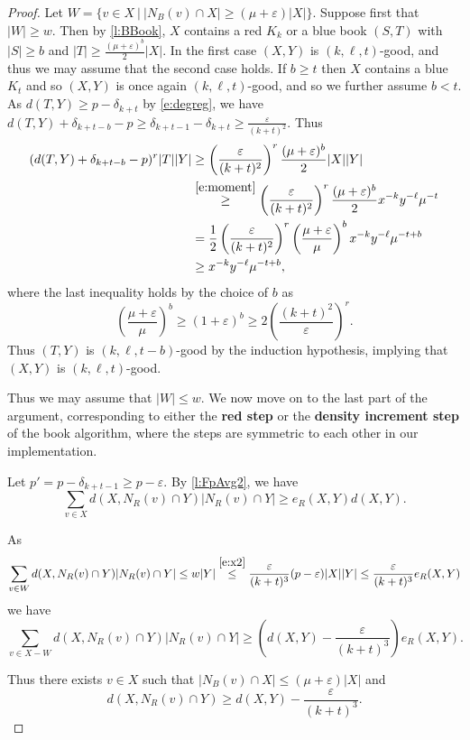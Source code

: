 \documentclass[reqno,final,12pt]{amsart}
\newcommand{\eps}{\varepsilon}
\newcommand{\fs}[2]{\left(\frac{#1}{#2}\right)}
\newcommand{\s}[1]{\left(#1\right)}
\begin{document}
\begin{proof}
Let  $W =\{ v \in X \: | \:  |N_B(v) \cap X| \geq (\mu + \eps)|X|\}$. Suppose first that $|W| \geq w$. Then by \cref{l:BBook}, $X$ contains a red $K_k$ or a blue book $(S,T)$ with $|S| \geq b$ and $|T| \geq  \frac{ (\mu + \eps)^b}{2}|X|$. In the first case $(X,Y)$ is $(k,\ell,t)$-good, and thus we may assume that the second case holds.  If $b \geq t$ then $X$ contains a blue $K_t$ and so  $(X,Y)$ is once again $(k,\ell,t)$-good, and so we further assume $b < t$.
As $d(T,Y) \geq p-\delta_{k+t}$ by \eqref{e:degreg}, we have $d(T,Y) + \delta_{k+t-b} -p \geq \delta_{k+t-1}-\delta_{k+t} \geq \frac{\eps}{(k+t)^2}.$
Thus \begin{align*} 
(d(T,Y) + \delta_{k+t-b} - p)^r |T||Y| &\geq \fs{\eps }{(k+t)^2}^r \frac{(\mu + \eps)^b}{2}|X||Y| \\ &\stackrel{\eqref{e:moment}}{\geq}  \fs{\eps }{(k+t)^2}^r\frac{(\mu + \eps)^b}{2}x^{-k}y^{-\ell}\mu^{-t } \\& = \frac{1}{2}\fs{\eps}{(k+t)^2}^r\fs{\mu + \eps}{\mu}^b x^{-k}y^{-\ell}\mu^{-t+b} \\&\geq x^{-k}y^{-\ell}\mu^{-t+b},
\end{align*}
where the last inequality holds by the choice of $b$ as
$$ \fs{\mu + \eps}{\mu}^b \geq (1+\eps)^b \geq 2\fs{(k+t)^{2}}{\eps}^r.$$ 
Thus $(T,Y)$ is $(k,\ell,t-b)$-good by the induction hypothesis, implying that   $(X,Y)$ is $(k,\ell,t)$-good. 

Thus we may assume that $|W| \leq w$. We now move on to the last part of the argument, corresponding to either the \textbf{red step} or the \textbf{density increment step} of the book algorithm, where the steps are symmetric to each other in our implementation. 

Let $p'= p-\delta_{k+t-1} \geq p-\eps.$ By \cref{l:FpAvg2}, we have \begin{equation}
\sum_{v\in X}d(X,N_R(v) \cap Y)|N_R(v) \cap Y| \geq e_R(X,Y)d(X,Y).
\end{equation}

As $$\sum_{v\in W}d(X,N_R(v) \cap Y)|N_R(v) \cap Y| \leq w|Y| \stackrel{\eqref{e:x2}}{\leq}\frac{\eps}{(k+t)^3}(p -\eps)|X||Y|  \leq  \frac{\eps}{(k+t)^3} e_R(X,Y)$$
we have  \begin{equation*}
\sum_{v\in X - W}d(X,N_R(v) \cap Y)|N_R(v) \cap Y| \geq \s{d(X,Y)-\frac{\eps}{(k+t)^3}}e_R(X,Y).
\end{equation*}

 
Thus there exists $v\in X$ such that $|N_B(v) \cap X| \leq (\mu+\eps)|X|$ and  \begin{equation}\label{e:alpha}d(X,N_R(v) \cap Y) \geq d(X,Y)-\frac{\eps}{(k+t)^3}.\end{equation}  


\end{proof}
\end{document}

